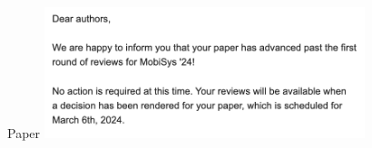 




\begin{frame}{Paper}
    \centering
    \includegraphics[height=0.7\textheight,width=0.7\textwidth,keepaspectratio]{fishsense_paper.png}
\end{frame}

